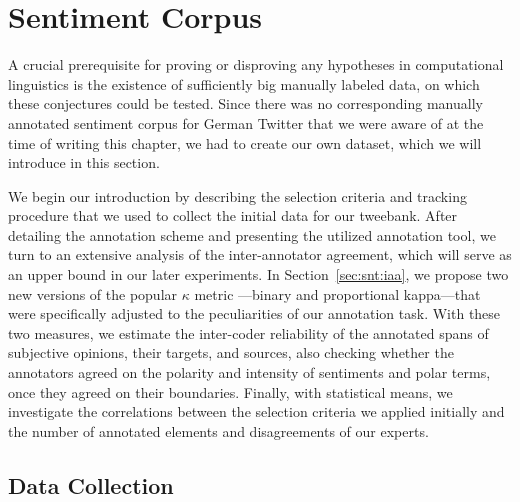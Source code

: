 

\chapter{Sentiment Corpus}\label{chap:corpus}

A crucial prerequisite for proving or disproving any hypotheses in
computational linguistics is the existence of sufficiently big
manually labeled data, on which these conjectures could be tested.
Since there was no corresponding manually annotated sentiment corpus
for German Twitter that we were aware of at the time of writing this
chapter, we had to create our own dataset, which we will introduce in
this section.

We begin our introduction by describing the selection criteria and
tracking procedure that we used to collect the initial data for our
tweebank.  After detailing the annotation scheme and presenting the
utilized annotation tool, we turn to an extensive analysis of the
inter-annotator agreement, which will serve as an upper bound in our
later experiments.  In Section~\ref{sec:snt:iaa}, we propose two new
versions of the popular $\kappa$ metric \cite{Cohen:60}---binary and
proportional kappa---that were specifically adjusted to the
peculiarities of our annotation task.  With these two measures, we
estimate the inter-coder reliability of the annotated spans of
subjective opinions, their targets, and sources, also checking whether
the annotators agreed on the polarity and intensity of sentiments and
polar terms, once they agreed on their boundaries.  Finally, with
statistical means, we investigate the correlations between the
selection criteria we applied initially and the number of annotated
elements and disagreements of our experts.

\section{Data Collection}

